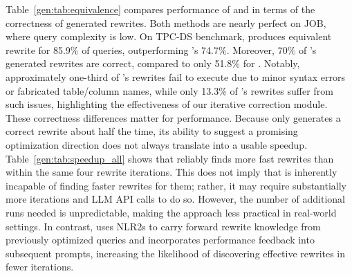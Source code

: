 Table~\ref{gen:tab:equivalence} compares performance of \genrewrite and \baseline in terms of the correctness of generated rewrites. Both methods are nearly perfect on JOB, where query complexity is low. On TPC-DS benchmark, \genrewrite produces  equivalent rewrite for 85.9\% of queries, outperforming \baseline’s 74.7\%. Moreover, 70\% of \genrewrite’s generated rewrites are correct, compared to only 51.8\% for \baseline. Notably, approximately one-third of \baseline’s rewrites fail to execute due to minor syntax errors or fabricated table/column names, while only 13.3\% of \genrewrite’s rewrites suffer from such issues, highlighting the effectiveness of our iterative correction module. These correctness differences matter for performance. Because \baseline only generates a correct rewrite about half the time, its ability to suggest a promising optimization direction does not always translate into a usable speedup. Table~\ref{gen:tab:speedup_all} shows that \genrewrite reliably finds more fast rewrites than \baseline within the same four rewrite iterations. This does not imply that \baseline is inherently incapable of finding faster rewrites for them; rather, it may require substantially more iterations and LLM API calls to do so. However, the number of additional runs needed is unpredictable, making the approach less practical in real-world settings. In contrast, \genrewrite uses NLR2s to carry forward rewrite knowledge from previously optimized queries and incorporates performance feedback into subsequent prompts, increasing the likelihood of discovering effective rewrites in fewer iterations.




